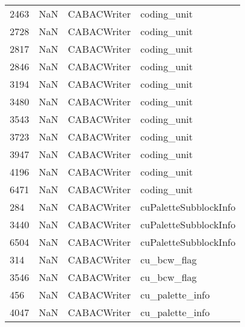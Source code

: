 \begin{tabular}{llll}
2463 &                   NaN &                CABACWriter &                               coding\_unit \\
2728 &                   NaN &                CABACWriter &                               coding\_unit \\
2817 &                   NaN &                CABACWriter &                               coding\_unit \\
2846 &                   NaN &                CABACWriter &                               coding\_unit \\
3194 &                   NaN &                CABACWriter &                               coding\_unit \\
3480 &                   NaN &                CABACWriter &                               coding\_unit \\
3543 &                   NaN &                CABACWriter &                               coding\_unit \\
3723 &                   NaN &                CABACWriter &                               coding\_unit \\
3947 &                   NaN &                CABACWriter &                               coding\_unit \\
4196 &                   NaN &                CABACWriter &                               coding\_unit \\
6471 &                   NaN &                CABACWriter &                               coding\_unit \\
284  &                   NaN &                CABACWriter &                     cuPaletteSubblockInfo \\
3440 &                   NaN &                CABACWriter &                     cuPaletteSubblockInfo \\
6504 &                   NaN &                CABACWriter &                     cuPaletteSubblockInfo \\
314  &                   NaN &                CABACWriter &                               cu\_bcw\_flag \\
3546 &                   NaN &                CABACWriter &                               cu\_bcw\_flag \\
456  &                   NaN &                CABACWriter &                           cu\_palette\_info \\
4047 &                   NaN &                CABACWriter &                           cu\_palette\_info \\

\end{tabular}
